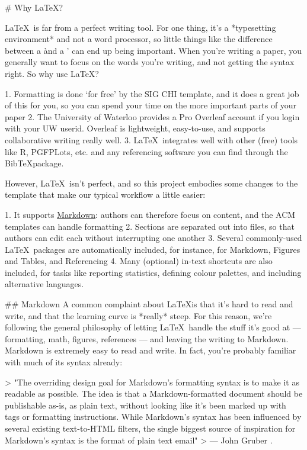 %
%
\begin{markdown}

# Why \LaTeX?

\LaTeX\ is far from a perfect writing tool. For one thing, it's a *typesetting environment* and not a word processor, so little things like the difference between a \` and a ' can end up being important. When you're writing a paper, you generally want to focus on the words you're writing, and not getting the syntax right. So why use \LaTeX?

1. Formatting is done `for free' by the SIG CHI template, and it does a great job of this for you, so you can spend your time on the more important parts of your paper
2. The University of Waterloo provides a Pro Overleaf account if you login with your UW userid. Overleaf is lightweight, easy-to-use, and supports collaborative writing really well. 
3. \LaTeX\ integrates well with other (free) tools like R, PGFPLots, etc. and any referencing software you can find through the Bib\TeX package.

However, \LaTeX\ isn't perfect, and so this project embodies some changes to the template that make our typical workflow a little easier:

1. It supports \href{https://daringfireball.net/projects/markdown/}{Markdown}: authors can therefore focus on content, and the ACM templates can handle formatting
2. Sections are separated out into files, so that authors can edit each without interrupting one another
3. Several commonly-used \LaTeX\ packages are automatically included, for instance, for Markdown, Figures and Tables, and Referencing
4. Many (optional) in-text shortcuts are also included, for tasks like reporting statistics, defining colour palettes, and including alternative languages. 



## Markdown
A common complaint about \LaTeX is that it's hard to read and write, and that the learning curve is *really* steep. For this reason, we're following the general philosophy of letting \LaTeX\ handle the stuff it's good at --- formatting, math, figures, references --- and leaving the writing to Markdown. Markdown is extremely easy to read and write. In fact, you're probably familiar with much of its syntax already: 

>    "The overriding design goal for Markdown’s formatting syntax is to make it as readable as possible. The idea is that a Markdown-formatted document should be publishable as-is, as plain text, without looking like it’s been marked up with tags or formatting instructions. While Markdown’s syntax has been influenced by several existing text-to-HTML filters, the single biggest source of inspiration for Markdown’s syntax is the format of plain text email"
> --- John Gruber \citep{gruber2006}.


\end{markdown}
